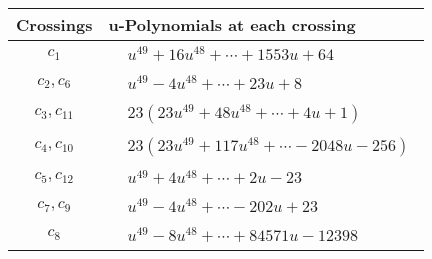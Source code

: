 \documentclass[1p]{elsarticle_modified}
\theoremstyle{definition}
\begin{document}
\begin{tabular}{m{50pt}|m{274pt}}
Crossings & \hspace{64pt}u-Polynomials at each crossing \\
\hline $$\begin{aligned}c_{1}\end{aligned}$$&$\begin{aligned}
&u^{49}+16 u^{48}+\cdots+1553 u+64
\end{aligned}$\\
\hline $$\begin{aligned}c_{2},c_{6}\end{aligned}$$&$\begin{aligned}
&u^{49}-4 u^{48}+\cdots+23 u+8
\end{aligned}$\\
\hline $$\begin{aligned}c_{3},c_{11}\end{aligned}$$&$\begin{aligned}
&23(23 u^{49}+48 u^{48}+\cdots+4 u+1)
\end{aligned}$\\
\hline $$\begin{aligned}c_{4},c_{10}\end{aligned}$$&$\begin{aligned}
&23(23 u^{49}+117 u^{48}+\cdots-2048 u-256)
\end{aligned}$\\
\hline $$\begin{aligned}c_{5},c_{12}\end{aligned}$$&$\begin{aligned}
&u^{49}+4 u^{48}+\cdots+2 u-23
\end{aligned}$\\
\hline $$\begin{aligned}c_{7},c_{9}\end{aligned}$$&$\begin{aligned}
&u^{49}-4 u^{48}+\cdots-202 u+23
\end{aligned}$\\
\hline $$\begin{aligned}c_{8}\end{aligned}$$&$\begin{aligned}
&u^{49}-8 u^{48}+\cdots+84571 u-12398
\end{aligned}$\\
\hline
\end{tabular}\\~\\
\newpage\renewcommand{\arraystretch}{1}
\end{document}
